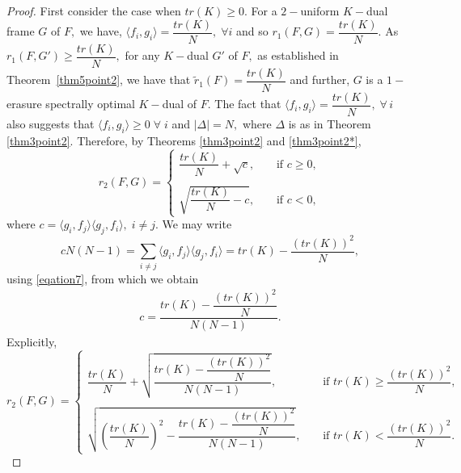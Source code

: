 \documentclass[final,1p,times]{elsarticle}
\begin{document}
	
	\begin{proof}
			First consider the case when $tr(K)\geq 0.$ For a $2-$uniform $K-$dual frame $G$ of $F,$ we have, $ \langle f_i,g_i \rangle = \dfrac{tr(K)}{N},\; \forall i$  and so $r_{1}(F,G) =\dfrac{tr(K)}{N}.$  As $r_{1}(F,G') \geq \dfrac{tr(K)}{N},$ for any $K-$dual $G'$ of $F,$ as established in Theorem~\ref{thm5point2}, we have that $\tilde{r}_{1} (F) = \dfrac{tr(K)}{N}$ and further, $G$ is a $1-$erasure spectrally optimal $K-$dual of $F.$ The fact that  $ \langle f_i,g_i \rangle = \dfrac{tr(K)}{N},\; \forall\, i$ also suggests that $\langle f_i,g_i \rangle \geq 0\; \forall\;i$ and $|\Delta| = N,$ where $\Delta$ is as in Theorem \ref{thm3point2}. Therefore, by Theorems \ref{thm3point2} and \ref{thm3point2*},
		$$ r_{2}(F,G) = \begin{cases}
			\dfrac{tr(K)}{N} + \sqrt{c},\;\;  & \text{if $c \geq 0,$}\\~\\
			\sqrt{\dfrac{tr(K)}{N} -c},\;\;\;\; & \text{if $c < 0$},
		\end{cases}$$
		where $c=   \langle g_i,f_j \rangle \langle g_j,f_i \rangle,\;i \neq j.$ We may write
		$$cN(N-1) = \sum\limits_{i \neq j}  \langle g_i,f_j \rangle \langle g_j,f_i \rangle = tr(K) - \dfrac{\left(tr(K)\right)^2}{N}, $$
		using \eqref{eqation7}, from which we obtain
		\begin{align}\label{equation4point16}
			c = \dfrac{tr(K) - \dfrac{\left(tr(K)\right)^2}{N}}{N(N-1)}.
		\end{align}
Explicitly, $$r_{2} (F,G) = \begin{cases}
	\dfrac{tr(K)}{N} + \sqrt{\dfrac{tr(K) - \dfrac{\left(tr(K)\right)^2}{N}}{N(N-1)}},\;\;  & \text{if $tr(K) \geq \dfrac{\left(tr(K)\right)^2}{N},$}\\~\\
	\sqrt{\left(\dfrac{tr(K)}{N}\right)^2 -\dfrac{tr(K) - \dfrac{\left(tr(K)\right)^2}{N}}{N(N-1)}},\;\;\;\; & \text{if $tr(K) < \dfrac{\left(tr(K)\right)^2}{N}$}.
\end{cases}$$	
	

\end{proof}
\end{document}
